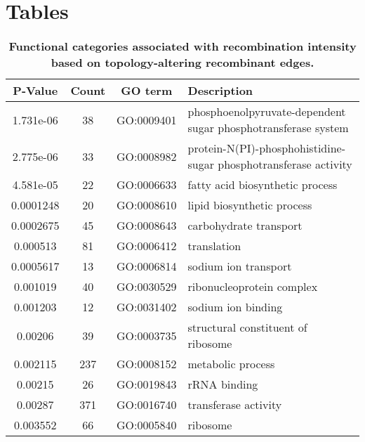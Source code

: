 \documentclass[10pt]{article}
\providecommand{\tabularnewline}{\\}
\begin{document}

\section*{Tables}

\begin{table}[!ht]
\caption{
{\bf Functional categories associated with 
recombination intensity based on topology-altering recombinant edges.}}
\noindent \begin{centering}
\begin{tabular}{cccl}
\hline 
P-Value & Count & GO term & Description\tabularnewline
\hline 
1.731e-06 & 38 & GO:0009401 & phosphoenolpyruvate-dependent sugar phosphotransferase system\tabularnewline
2.775e-06 & 33 & GO:0008982 & protein-N(PI)-phosphohistidine-sugar phosphotransferase activity\tabularnewline
4.581e-05 & 22 & GO:0006633 & fatty acid biosynthetic process\tabularnewline
0.0001248 & 20 & GO:0008610 & lipid biosynthetic process\tabularnewline
0.0002675 & 45 & GO:0008643 & carbohydrate transport\tabularnewline
0.000513 & 81 & GO:0006412 & translation\tabularnewline
0.0005617 & 13 & GO:0006814 & sodium ion transport\tabularnewline
0.001019 & 40 & GO:0030529 & ribonucleoprotein complex\tabularnewline
0.001203 & 12 & GO:0031402 & sodium ion binding\tabularnewline
0.00206 & 39 & GO:0003735 & structural constituent of ribosome\tabularnewline
0.002115 & 237 & GO:0008152 & metabolic process\tabularnewline
0.00215 & 26 & GO:0019843 & rRNA binding\tabularnewline
0.00287 & 371 & GO:0016740 & transferase activity\tabularnewline
0.003552 & 66 & GO:0005840 & ribosome\tabularnewline
\hline 
\end{tabular}
\par\end{centering}
\label{tab:functional}
\end{table}
\end{document}
